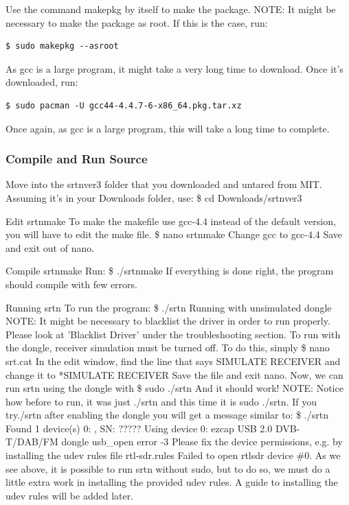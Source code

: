 \documentclass[11pt]{article} %
\begin{document}
Use the command makepkg by itself to make the package. NOTE: It might be necessary to make the package as root. If this is the case, run:

\begin{verbatim}
$ sudo makepkg --asroot
\end{verbatim}

As gcc is a large program, it might take a very long time to download. Once it's downloaded, run:

\begin{verbatim}
$ sudo pacman -U gcc44-4.4.7-6-x86_64.pkg.tar.xz
\end{verbatim}

Once again, as gcc is a large program, this will take a long time to complete.

\subsubsection{Compile and Run Source}
Move into the srtnver3 folder that you downloaded and untared from MIT. Assuming it's in your Downloads folder, use:
\$ cd Downloads/srtnver3

Edit srtnmake
To make the makefile use gcc-4.4 instead of the default version, you will have to edit the make file.
\$ nano srtnmake
Change gcc to gcc-4.4
Save and exit out of nano.

Compile srtnmake
Run:
\$ ./srtnmake
If everything is done right, the program should compile with few errors.

Running srtn
To run the program:
\$ ./srtn
Running with unsimulated dongle
NOTE: It might be necessary to blacklist the driver in order to run properly. Please look at 'Blacklist Driver' under the troubleshooting section.
To run with the dongle, receiver simulation must be turned off. To do this, simply
\$ nano srt.cat
In the edit window, find the line that says
SIMULATE RECEIVER
and change it to
*SIMULATE RECEIVER
Save the file and exit nano. Now, we can run srtn using the dongle with
\$ sudo ./srtn
And it should work!
NOTE: Notice how before to run, it was just ./srtn and this time it is sudo ./srtn. If you try./srtn after enabling the dongle you will get a message similar to:
\$ ./srtn
Found 1 device(s)
  0:  ,   SN:  ?????
Using device 0: ezcap USB 2.0 DVB-T/DAB/FM dongle
usb\_open error -3
Please fix the device permissions, e.g. by installing the udev rules file rtl-sdr.rules
Failed to open rtlsdr device \#0.
As we see above, it is possible to run srtn without sudo, but to do so, we must do a little extra work in installing the provided udev rules. A guide to installing the udev rules will be added later.
\end{document}
